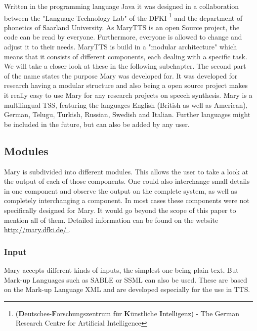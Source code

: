 \documentclass[a4paper, 12pt]{article}
\begin{document}
Written in the programming language Java it was designed in a collaboration between the  "Language Technology Lab" of the DFKI \footnote{(\textbf{D}eutsches-\textbf{F}orschungszentrum für \textbf{K}ünstliche \textbf{I}ntelligenz) - The German Research Centre for Artificial Intelligence} and the department of phonetics of Saarland University.
As MaryTTS is an open Source project, the code can be read by everyone. Furthermore, everyone is allowed to change and adjust it to their needs.\newline \newline
MaryTTS is build in a "modular architecture" which means that it consists of different components, each dealing with a specific task. We will take a closer look at these in the following subchapter.
The second part of the name states the purpose Mary was developed for.
It was developed for research having a modular structure and also being a open source project makes it really easy to use Mary for any research projects on speech synthesis. \newline \newline
Mary is a multilingual TSS, featuring the languages English (British as well as American), German, Telugu, Turkish, Russian, Swedish and Italian.
Further languages might be included in the future, but can also be added by any user. \newline \newline

\subsection{Modules}

Mary is subdivided into different modules.
This allows the user to take a look at the output of each of those components.
One could also interchange small details in one component and observe the output on the complete system, as well as completely interchanging a component.
In most cases these components were not specifically designed for Mary.
It would go beyond the scope of this paper to mention all of them.
Detailed information can be found on the website \url{http://mary.dfki.de/ }.

\subsubsection*{Input}

Mary accepts different kinds of inputs, the simplest one being plain text.
But Mark-up Languages such as SABLE or SSML can also be used.
These are based on the Mark-up Language XML and are developed especially for the use in TTS.
\end{document}
